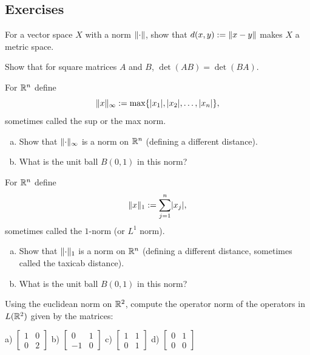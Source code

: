 \subsection{Exercises}

\begin{exercise}
For a vector space $X$ with a norm $\lVert {\cdot} \rVert$, show that
$d(x,y) := \lVert {x-y} \rVert$ makes $X$ a metric space.
\end{exercise}

\begin{exercise}[Easy]
Show that for square matrices $A$ and $B$, $\det(AB) = \det(BA)$.
\end{exercise}

\begin{exercise}
For ${\mathbb{R}}^n$ define
\begin{equation*}
\lVert {x} \rVert_{\infty} := \max \{ \lvert {x_1} \rvert, \lvert {x_2} \rvert, \ldots, \lvert {x_n} \rvert \} ,
\end{equation*}
sometimes called the sup or the max norm.
\begin{enumerate}[a)]
\item
Show that $\lVert {\cdot} \rVert_\infty$ is a norm on ${\mathbb{R}}^n$ (defining a different
distance).
\item
What is the unit ball $B(0,1)$ in this norm?
\end{enumerate}
\end{exercise}

\begin{exercise}
For ${\mathbb{R}}^n$ define
\begin{equation*}
\lVert {x} \rVert_{1} := \sum_{j=1}^n \lvert {x_j} \rvert,
\end{equation*}
sometimes called the $1$-norm (or $L^1$ norm).
\begin{enumerate}[a)]
\item
Show that $\lVert {\cdot} \rVert_1$ is a norm on ${\mathbb{R}}^n$ (defining a different
distance, sometimes called the taxicab distance).
\item
What is the unit ball $B(0,1)$ in this norm?
\end{enumerate}
\end{exercise}

\begin{exercise}
Using the euclidean norm on ${\mathbb{R}}^2$, compute the operator norm of the
operators in $L({\mathbb{R}}^2)$ given by the matrices:

\medskip
\noindent
a)
$\left[
\begin{smallmatrix}
1 & 0 \\
0 & 2
\end{smallmatrix}
\right]$
\quad
b)
$\left[
\begin{smallmatrix}
0 & 1 \\
-1 & 0
\end{smallmatrix}
\right]$
\quad
c)
$\left[
\begin{smallmatrix}
1 & 1 \\
0 & 1
\end{smallmatrix}
\right]$
\quad
d)
$\left[
\begin{smallmatrix}
0 & 1 \\
0 & 0
\end{smallmatrix}
\right]$
\end{exercise}


